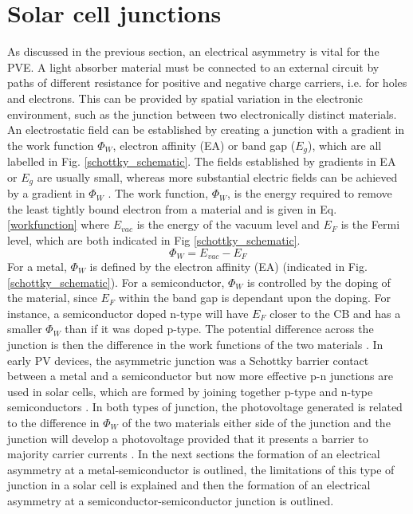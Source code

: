 \documentclass[11pt, twoside]{report}
\begin{document}
\section{Solar cell junctions}\label{junctions}
As discussed in the previous section, an electrical asymmetry is vital for the PVE. A light absorber material must be connected to an external circuit by paths of different resistance for positive and negative charge carriers, i.e. for holes and electrons. This can be provided by spatial variation in the electronic environment, such as the junction between two electronically distinct materials.
An electrostatic field can be established by creating a junction with a gradient in the work function $\Phi_W$, electron affinity (EA) or band gap ($E_g$), which are all labelled in Fig. \ref{schottky_schematic}. The fields established by gradients in EA or $E_g$ are usually small, whereas more substantial electric fields can be achieved by a gradient in $\Phi_W$ \cite{Nelson5}.
The work function, $\Phi_W$, is the energy required to remove the least tightly bound electron from a material and is given in Eq. \ref{workfunction} where $E_{vac}$ is the energy of the vacuum level and $E_F$ is the Fermi level, which are both indicated in Fig \ref{schottky_schematic}. 
\begin{equation}\label{workfunction}
\Phi_W = E_{vac} - E_F
\end{equation}
For a metal, $\Phi_W$ is defined by the electron affinity (EA) (indicated in Fig. \ref{schottky_schematic}). For a semiconductor, $\Phi_W$ is controlled by the doping of the material, since $E_F$ within the band gap is dependant upon the doping. For instance, a semiconductor doped n-type will have $E_F$ closer to the CB and has a smaller $\Phi_W$ than if it was doped p-type. The potential difference across the junction is then the difference in the work functions of the two materials \cite{Nelson5}.
In early PV devices, the asymmetric junction was a Schottky barrier contact between a metal and a semiconductor but now more effective p-n junctions are used in solar cells, which are formed by joining together p-type and n-type semiconductors \cite{Nelson1}.
In both types of junction, the photovoltage generated is related to the difference in $\Phi_W$ of the two materials either side of the junction and the junction will develop a photovoltage provided that it presents a barrier to majority carrier currents \cite{Nelson5}. In the next sections the formation of an electrical asymmetry at a metal-semiconductor is outlined, the limitations of this type of junction in a solar cell is explained and then the formation of an electrical asymmetry at a semiconductor-semiconductor junction is outlined.
\end{document}
